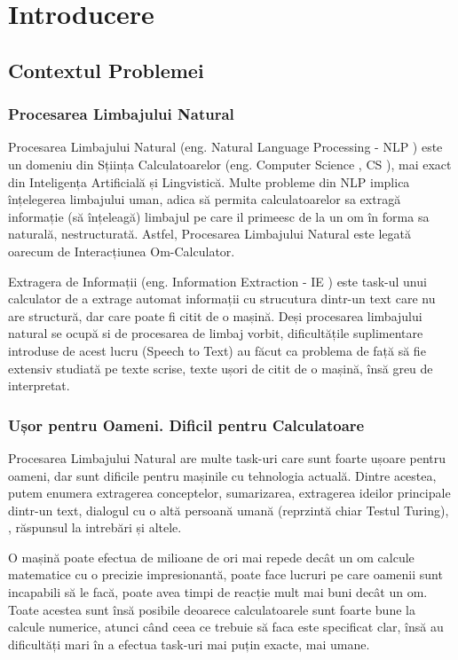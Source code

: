 \chapter{Introducere}
\label{chapter:intro}

\section{Contextul Problemei}

\subsection{Procesarea Limbajului Natural}

Procesarea Limbajului Natural (eng. Natural Language Processing - NLP ) este un domeniu din Sțiința Calculatoarelor (eng. Computer Science , CS ), mai exact din Inteligența Artificială și Lingvistică. Multe probleme din NLP implica înțelegerea limbajului uman, adica să permita calculatoarelor sa extragă informație (să înțeleagă) limbajul pe care il primeesc de la un om în forma sa naturală, nestructurată. Astfel, Procesarea Limbajului Natural este legată oarecum de Interacțiunea Om-Calculator.

Extragera de Informații (eng. Information Extraction - IE ) este task-ul unui calculator de a extrage automat informații cu strucutura dintr-un text care nu are structură, dar care poate fi citit de o mașină. Deși procesarea limbajului natural se ocupă si de procesarea de limbaj vorbit, dificultățile suplimentare introduse de acest lucru (Speech to Text) au făcut ca problema de față să fie extensiv studiată pe texte scrise, texte ușori de citit de o mașină, însă greu de interpretat.


\subsection{Ușor pentru Oameni. Dificil pentru Calculatoare}

Procesarea Limbajului Natural are multe task-uri care sunt foarte ușoare pentru oameni, dar sunt dificile pentru mașinile cu tehnologia actuală. Dintre acestea, putem enumera extragerea conceptelor, sumarizarea, extragerea ideilor principale dintr-un text, dialogul cu o altă persoană umană (reprzintă chiar Testul Turing), , răspunsul la intrebări și altele.

O mașină poate efectua de milioane de ori mai repede decât un om calcule matematice cu o precizie impresionantă, poate face lucruri pe care oamenii sunt incapabili să le facă, poate avea timpi de reacție mult mai buni decât un om. Toate acestea sunt însă posibile deoarece calculatoarele sunt foarte bune la calcule numerice, atunci când ceea ce trebuie să faca este specificat clar, însă au dificultăți mari în a efectua task-uri mai puțin exacte, mai umane.


